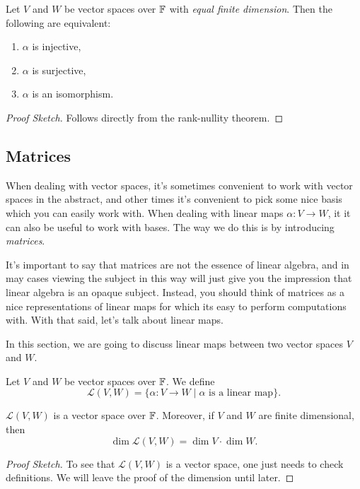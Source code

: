 \documentclass[a4paper]{scrartcl}
\begin{document}
\begin{lemma}
    Let $V$ and $W$ be vector spaces over $\mathbb{F}$ with \emph{equal finite dimension}. Then the following are equivalent: 
    \begin{enumerate}[label=(\roman*)]
        \item $\alpha$ is injective,
        \item $\alpha$ is surjective,
        \item $\alpha$ is an isomorphism.
    \end{enumerate}
\end{lemma}
\begin{proof}[Proof Sketch]
    Follows directly from the rank-nullity theorem.
\end{proof}

\subsection{Matrices}

When dealing with vector spaces, it's sometimes convenient to work with vector spaces in the abstract, and other times it's convenient to pick some nice basis which you can easily work with.
When dealing with linear maps $\alpha: V \rightarrow W$, it it can also be useful to work with bases. The way we do this is by introducing \emph{matrices}.

It's important to say that matrices are not the essence of linear algebra, and in may cases viewing the subject in this way will just give you the impression that linear algebra is an opaque subject. Instead, you should think of matrices as a nice representations of linear maps for which its easy to perform computations with.
With that said, let's talk about linear maps.

In this section, we are going to discuss linear maps between two vector spaces $V$ and $W$.

\begin{definition}
    Let $V$ and $W$ be vector spaces over $\mathbb{F}$. We define
    $$
    \mathcal{L}(V, W) = \{\alpha: V \rightarrow W \mid \alpha \text{ is a linear map}\}.
    $$
\end{definition}

\begin{proposition}
    $\mathcal{L}(V, W)$ is a vector space over $\mathbb{F}$. Moreover, if $V$ and $W$ are finite dimensional, then
    $$
    \dim \mathcal{L}(V, W) = \dim V \cdot \dim W.
    $$
\end{proposition}
\begin{proof}[Proof Sketch]    
    To see that $\mathcal{L}(V, W)$ is a vector space, one just needs to check definitions. We will leave the proof of the dimension until later.
\end{proof}
\end{document}
